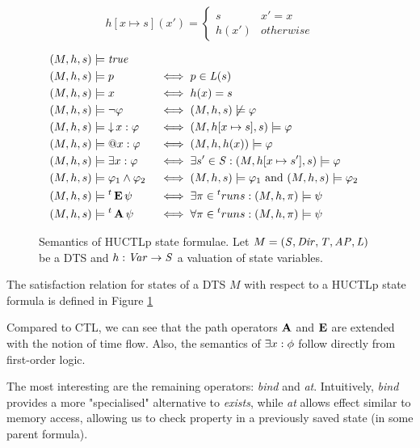 \[
	h[x \mapsto s](x') = \begin{cases}
		s & x' = x \\
		h(x') & otherwise
	\end{cases}
\]

\begin{figure}
	
	\begin{alignat*}{2}
	(M,h,s) &\models \mathit{true}	\\
	(M,h,s) &\models p										   && \iff p \in \mathit{L}(s) \\
	(M,h,s) &\models x										   && \iff h(x) = s \\
	(M,h,s) &\models \neg \varphi  						  && \iff (M, h,s) \not\models \varphi \\
	(M,h,s) &\models \operatorname{\downarrow} x : \varphi 			   && \iff (M,h[x \mapsto s], s) \models \varphi \\
	(M,h,s) &\models \operatorname{@\!} x : \varphi 				&& \iff (M,h,h(x)) \models \varphi \\
	(M,h,s) &\models \exists x : \varphi 		  && \iff \exists s' \in \mathit{S} :  (M,h[x \mapsto s'], s) \models \varphi \\	
	(M,h,s) &\models \varphi_1 \land \varphi_2 	   && \iff (M,h,s) \models \varphi_1 \text{ and } (M,h,s) \models \varphi_2  \\
	(M,h,s) &\models {}^{t}\operatorname{\mathbf{E}} \psi 			 && \iff \exists \pi \in {}^{t}runs : (M,h,\pi) \models \psi \\
	(M,h,s) &\models {}^{t}\operatorname{\mathbf{A}} \psi 			 && \iff \forall \pi \in {}^{t}runs : (M,h,\pi) \models \psi \\	
	\end{alignat*}
	
	\caption{Semantics of \ac{HUCTLp} state formulae. Let $M = (\mathit{S}, \mathit{Dir}, \mathit{T}, \mathit{AP}, \mathit{L})$ be a \ac{DTS} and $h : \mathit{Var} \to \mathit{S}$ a valuation of state variables.}
	\label{fig:semState}
\end{figure}

The satisfaction relation for states of a \ac{DTS} $M$ with respect to a \ac{HUCTLp} state formula is defined in Figure \ref{fig:semState}

Compared to \ac{CTL}, we can see that the path operators $\operatorname{\mathbf{A}}$ and $\operatorname{\mathbf{E}}$ are extended with the notion of time flow. Also, the semantics of $\exists x : \phi$ follow directly from first-order logic. 

The most interesting are the remaining operators: \emph{bind} and \emph{at}. Intuitively, \emph{bind} provides a more "specialised" alternative to \emph{exists}, while \emph{at} allows effect similar to memory access, allowing us to check property in a previously saved state (in some parent formula).

